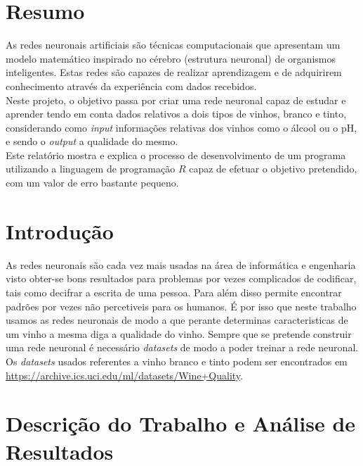 \documentclass{article}
\begin{document}
\section{Resumo}
As redes neuronais artificiais são técnicas computacionais que apresentam um modelo matemático inspirado no cérebro (estrutura neuronal) de organismos inteligentes. Estas redes são capazes de realizar aprendizagem e de adquirirem conhecimento através da experiência com dados recebidos.\\
Neste projeto, o objetivo passa por criar uma rede neuronal capaz de estudar e aprender tendo em conta dados relativos a dois tipos de vinhos, branco e tinto, considerando como \textit{input} informações relativas dos vinhos como o álcool ou o pH, e sendo o \textit{output} a qualidade do mesmo.\\
Este relatório mostra e explica o processo de desenvolvimento de um programa utilizando a linguagem de programação $R$ capaz de efetuar o objetivo pretendido, com um valor de erro bastante pequeno.  

\vspace*{\fill}

\newpage

\vspace*{\fill}
\tableofcontents
\vspace*{\fill}

\newpage

\vspace*{\fill}
\section{Introdução}
As redes neuronais são cada vez mais usadas na área de informática e engenharia visto obter-se bons resultados para problemas por vezes complicados de codificar, tais como decifrar a escrita de uma pessoa. Para além disso permite encontrar padrões por vezes não percetiveis para os humanos. É por isso que neste trabalho usamos as redes neuronais de modo a que perante determinas caracteristicas de um vinho a mesma diga a qualidade do vinho. Sempre que se pretende construir uma rede neuronal é necessário \textit{datasets} de modo a poder treinar a rede neuronal. Os \textit{datasets} usados referentes a vinho branco e tinto podem ser encontrados em \url{https://archive.ics.uci.edu/ml/datasets/Wine+Quality}.
\vspace*{\fill}

\newpage

\section{Descrição do Trabalho e Análise de Resultados}
\end{document}
